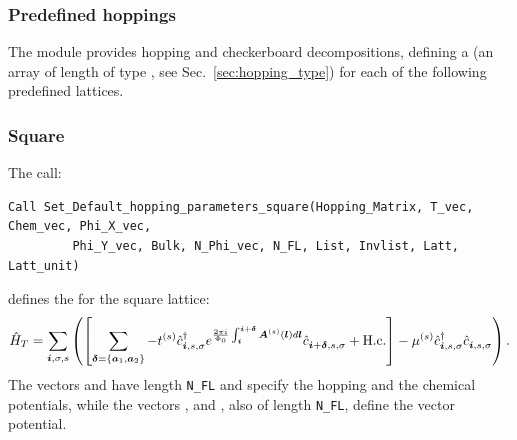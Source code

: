 \subsubsection{Predefined hoppings}

The  module provides hopping and checkerboard decompositions, defining a   (an array of length  of type  , see Sec.~\ref{sec:hopping_type}) for each of the following predefined lattices.

\subsubsection*{Square}
The call:
\begin{lstlisting}[style=fortran]
Call Set_Default_hopping_parameters_square(Hopping_Matrix, T_vec, Chem_vec, Phi_X_vec,  
         Phi_Y_vec, Bulk, N_Phi_vec, N_FL, List, Invlist, Latt, Latt_unit)
\end{lstlisting}
defines  the   for the square  lattice: 
\begin{equation}
\hat{H}_T  =   \sum_{\boldsymbol{i}, \sigma, s}  \left( \left[ \sum_{ \boldsymbol{\delta} = \left\{ \boldsymbol{a}_1, \boldsymbol{a}_2\right\} }    - t^{(s)} \hat{c}^{\dagger}_{\boldsymbol{i},s,\sigma}   e^{\frac{2 \pi i}{\Phi_0} \int_{\boldsymbol{i}}^{\boldsymbol{i}+ \boldsymbol{\delta}}  \boldsymbol{A}^{(s)}(\boldsymbol{l})  d \boldsymbol{l}}   \hat{c}^{}_{\boldsymbol{i} + \boldsymbol{\delta},s,\sigma} +  \mathrm{H.c.}   \right]    -  \mu^{(s)} \hat{c}^{\dagger}_{\boldsymbol{i},s,\sigma} \hat{c}^{}_{\boldsymbol{i},s,\sigma}  \right).
\end{equation}
The vectors   and  have  length \texttt{N\_FL} and specify the hopping and the chemical potentials, while the  vectors ,   and ,  also of  length  \texttt{N\_FL},    define the vector potential. 


